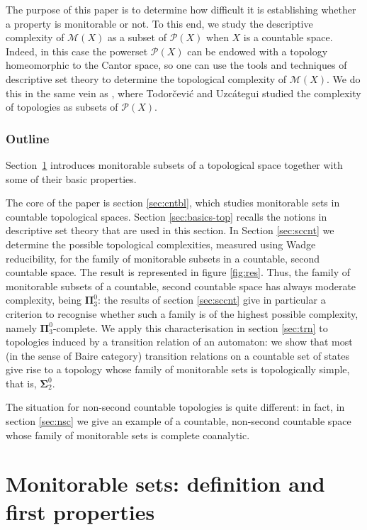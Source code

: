 \documentclass{lmcs}
\newcommand{\bsigma}{\boldsymbol\Sigma}
\newcommand{\bpi}{\boldsymbol\Pi}
\begin{document}
The purpose of this paper is to determine how difficult it is establishing whether a property is monitorable or not. 
To this end, we study the descriptive complexity of $\mathcal M (X)$ as a subset of $\mathcal{P}(X)$ when $X$ is a countable space. 
Indeed, in this case the powerset $\mathcal{P}(X)$ can be endowed with a topology homeomorphic to the Cantor space, so 
one can use the tools and techniques of descriptive set theory \cite{Kechris1995} to determine the topological complexity of $\mathcal{M}(X)$. 
We do this in the same vein as \cite{Todorc2014}, where Todor\v cevi\'c and Uzc\'ategui studied the complexity of topologies as subsets of $ \mathcal P (X)$.

\subsubsection*{Outline} 
% 
Section~\ref{sec:basics-mon} introduces monitorable subsets of a topological space together with some of their basic properties. 

The core of the paper is section \ref{sec:cntbl}, which studies monitorable sets in countable topological spaces.
Section \ref{sec:basics-top} recalls the notions in descriptive set theory that are used in this section. 
In Section \ref{sec:sccnt} we determine  the possible topological complexities, measured using Wadge reducibility, for the family of monitorable subsets in a countable, second countable space. 
The result is represented in figure \ref{fig:res}.
Thus, the family of monitorable subsets of a countable, second countable space has always moderate complexity, being $ \bpi^0_3$: the results of section \ref{sec:sccnt} give in particular a criterion to recognise whether such a family is of the highest possible complexity, namely $ \bpi^0_3$-complete.
We apply this characterisation in section \ref{sec:trn} to topologies induced by a transition relation of an automaton: we show that most (in the sense of Baire category) transition relations on a countable set of states give rise to a topology whose family of monitorable sets is topologically simple, that is, $ \bsigma^0_2$.

The situation for non-second countable topologies is quite different: in fact, in section \ref{sec:nsc} we give an example of a countable, non-second countable space whose family of monitorable sets is complete coanalytic.



\section{Monitorable sets: definition and first properties}
\label{sec:basics-mon}
\end{document}
